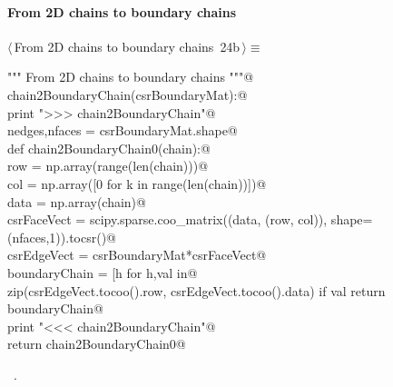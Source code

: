 \documentclass[11pt,oneside]{article}	%
\begin{document}
\paragraph{From 2D chains to boundary chains}
\begin{flushleft} \small \label{scrap38}
\protect{}$\langle\,$From 2D chains to boundary chains\nobreak\ {\footnotesize 24b}$\,\rangle\equiv$
\vspace{-1ex}
\begin{list}{}{} \item
\mbox{}\verb@""" From 2D chains to boundary chains """@\\
\mbox{}\verb@def chain2BoundaryChain(csrBoundaryMat):@\\
\mbox{}\verb@   print ">>> chain2BoundaryChain"@\\
\mbox{}\verb@   nedges,nfaces = csrBoundaryMat.shape@\\
\mbox{}\verb@   def chain2BoundaryChain0(chain):@\\
\mbox{}\verb@      row = np.array(range(len(chain)))@\\
\mbox{}\verb@      col = np.array([0 for k in range(len(chain))])@\\
\mbox{}\verb@      data = np.array(chain)@\\
\mbox{}\verb@      csrFaceVect = scipy.sparse.coo_matrix((data, (row, col)), shape=(nfaces,1)).tocsr()@\\
\mbox{}\verb@      csrEdgeVect = csrBoundaryMat*csrFaceVect@\\
\mbox{}\verb@      boundaryChain = [h for h,val in@\\
\mbox{}\verb@         zip(csrEdgeVect.tocoo().row, csrEdgeVect.tocoo().data) if val%2 != 0]@\\
\mbox{}\verb@      return boundaryChain@\\
\mbox{}\verb@   print "<<< chain2BoundaryChain"@\\
\mbox{}\verb@   return chain2BoundaryChain0@\\
\mbox{}\verb@@{\NWsep}
\end{list}
\vspace{-1ex}
\footnotesize\addtolength{\baselineskip}{-1ex}
\begin{list}{}{\setlength{\itemsep}{-\parsep}\setlength{\itemindent}{-\leftmargin}}
\item \NWtxtMacroRefIn\ .
\end{list}
\end{flushleft}
\end{document}
